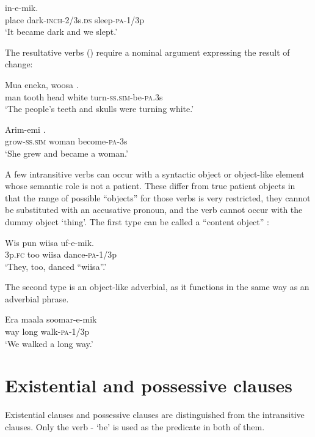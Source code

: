 \ea%
\label{ex:x1021}
\gll {}   in-e-mik. \\
     place  dark-\textsc{inch}-2/3s.\textsc{ds}  sleep-\textsc{pa}-1/3p \\
\glt `It became dark and we slept.'
\z

The resultative verbs () require a nominal argument expressing the result of change: 

\ea%
\label{ex:x963}
\gll Mua  eneka,  woosa   . \\
     man  tooth  head  white  turn-\textsc{ss}.\textsc{sim}-be-\textsc{pa}.3s \\
\glt `The people's teeth and skulls were turning white.'
\z

\ea%
\label{ex:x966}
\gll Arim-emi   . \\
     grow-\textsc{ss}.\textsc{sim}  woman  become-\textsc{pa}-3s \\
\glt `She grew and became a woman.'
\z

A few intransitive verbs can occur with a syntactic object or object-like element whose semantic role is not a patient. These differ from true patient objects in that the range of possible ``objects'' for those verbs is very restricted, they cannot be substituted with an accusative pronoun, and the verb cannot occur with the dummy object  `thing'. The first type can be called a ``content object'' \citep[179]{HakulinenEtAl1979}%
: 

\ea%
\label{ex:x308}
\gll Wis  pun  wiisa  uf-e-mik. \\
     3p.\textsc{fc}  too  wiisa  dance-\textsc{pa}-1/3p \\
\glt `They, too, danced ``wiisa''.'
\z

The second type is an object-like adverbial, as it functions in the same way as an adverbial phrase.

\ea%
\label{ex:x307}
\gll Era  maala  soomar-e-mik \\
     way  long  walk-\textsc{pa}-1/3p \\
\glt `We walked a long way.'
\z

\section{Existential and possessive clauses}
{}
Existential clauses and possessive clauses are distinguished from the intransitive clauses. Only the verb - `be' is used as the predicate in both of them. 

